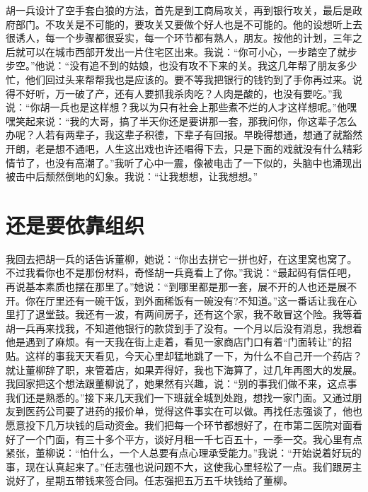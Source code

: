 \documentclass[12pt,oneside]{book}
\begin{document}
胡一兵设计了空手套白狼的方法，首先是到工商局攻关，再到银行攻关，最后是政府部门。不攻关是不可能的，要攻关又要做个好人也是不可能的。他的设想听上去很诱人，每一个步骤都很妥实，每一个环节都有熟人，朋友。按他的计划，三年之后就可以在城市西部开发出一片住宅区出来。我说：``你可小心，一步踏空了就步步空。''他说：``没有追不到的姑娘，也没有攻不下来的关。我这几年帮了朋友多少忙，他们回过头来帮帮我也是应该的。要不等我把银行的钱钓到了手你再过来。说得不好听，万一破了产，还有人要抓我杀肉吃？人肉是酸的，也没有要吃。''我说：``你胡一兵也是这样想？我以为只有社会上那些煮不烂的人才这样想呢。''他嘿嘿笑起来说：``我的大哥，搞了半天你还是要讲那一套，那我问你，你这辈子怎么办呢？人若有两辈子，我这辈子积德，下辈子有回报。早晚得想通，想通了就豁然开朗，老是想不通吧，人生这出戏也许还唱得下去，只是下面的戏就没有什么精彩情节了，也没有高潮了。''我听了心中一震，像被电击了一下似的，头脑中也涌现出被击中后颓然倒地的幻象。我说：``让我想想，让我想想。''


\chapter{还是要依靠组织}

我回去把胡一兵的话告诉董柳，她说：``你出去拼它一拼也好，在这里窝也窝了。不过我看你也不是那份材料，奇怪胡一兵竟看上了你。''我说：``最起码有信任吧，再说基本素质也摆在那里了。''她说：``到哪里都是那一套，展不开的人也还是展不开。你在厅里还有一碗干饭，到外面稀饭有一碗没有?不知道。''这一番话让我在心里打了退堂鼓。我还有一波，有两间房子，还有这个家，我不敢冒这个险。我等着胡一兵再来找我，不知道他银行的款贷到手了没有。一个月以后没有消息，我想着他是遇到了麻烦。有一天我在街上走着，看见一家商店门口有着``门面转让''的招贴。这样的事我天天看见，今天心里却猛地跳了一下，为什么不自己开一个药店？就让董柳辞了职，来管着店，如果弄得好，我也下海算了，过几年再图大的发展。我回家把这个想法跟董柳说了，她果然有兴趣，说：``别的事我们做不来，这点事我们还是熟悉的。''接下来几天我们一下班就全城到处跑，想找一家门面。又通过朋友到医药公司要了进药的报价单，觉得这件事实在可以做。再找任志强谈了，他也愿意投下几万块钱的启动资金。我们把每一个环节都想好了，在市第二医院对面看好了一个门面，有三十多个平方，谈好月租一千七百五十，一季一交。我心里有点紧张，董柳说：``怕什么，一个人总要有点心理承受能力。''我说：``开始说着好玩的事，现在认真起来了。''任志强也说问题不大，这使我心里轻松了一点。我们跟房主说好了，星期五带钱来签合同。任志强把五万五千块钱给了董柳。
\end{document}
